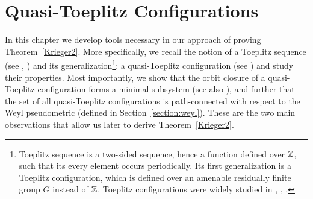 \chapter{Quasi-Toeplitz Configurations}\label{chapter:Toeplitz}

In this chapter we develop tools necessary in our approach of proving Theorem~\ref{Krieger2}. More specifically, we recall the notion of a Toeplitz sequence (see \cite{JK69}, \cite{DI88})
and its generalization\footnote{Toeplitz sequence is a two-sided sequence, hence a function defined over $\mathbb{Z}$, such that its every element occurs periodically. Its first generalization is a Toeplitz configuration, which is defined over an amenable residually finite group $G$ instead of $\mathbb{Z}$. Toeplitz configurations were widely studied in \cite{CP14}, \cite{CP08}, \cite{Krieger10}.}: a quasi-Toeplitz configuration (see \cite{CC19}) and study their properties. Most importantly, we show that the orbit closure of a quasi-Toeplitz configuration forms a minimal subsystem (see also \cite{CC19}), and further that the set of all quasi-Toeplitz configurations is path-connected with respect to the Weyl pseudometric (defined in Section~\ref{section:weyl}). 
These are the two main observations that allow us later to derive Theorem~\ref{Krieger2}.

